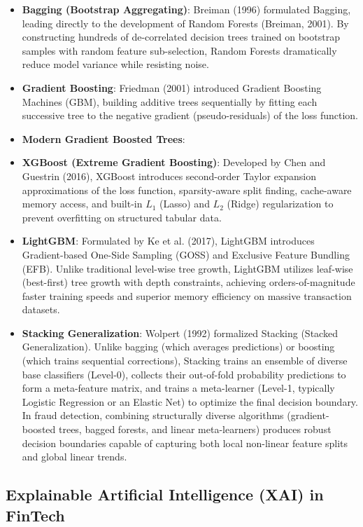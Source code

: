 \documentclass[12pt,a4paper,oneside]{report}
\begin{document}
\begin{itemize}[leftmargin=0.35in]
\item \textbf{Bagging (Bootstrap Aggregating)}: Breiman (1996) formulated Bagging, leading directly to the development of Random Forests (Breiman, 2001). By constructing hundreds of de-correlated decision trees trained on bootstrap samples with random feature sub-selection, Random Forests dramatically reduce model variance while resisting noise.
\item \textbf{Gradient Boosting}: Friedman (2001) introduced Gradient Boosting Machines (GBM), building additive trees sequentially by fitting each successive tree to the negative gradient (pseudo-residuals) of the loss function.
\item \textbf{Modern Gradient Boosted Trees}:
\item \textbf{XGBoost (Extreme Gradient Boosting)}: Developed by Chen and Guestrin (2016), XGBoost introduces second-order Taylor expansion approximations of the loss function, sparsity-aware split finding, cache-aware memory access, and built-in $L_1$ (Lasso) and $L_2$ (Ridge) regularization to prevent overfitting on structured tabular data.
\item \textbf{LightGBM}: Formulated by Ke et al. (2017), LightGBM introduces Gradient-based One-Side Sampling (GOSS) and Exclusive Feature Bundling (EFB). Unlike traditional level-wise tree growth, LightGBM utilizes leaf-wise (best-first) tree growth with depth constraints, achieving orders-of-magnitude faster training speeds and superior memory efficiency on massive transaction datasets.
\item \textbf{Stacking Generalization}: Wolpert (1992) formalized Stacking (Stacked Generalization). Unlike bagging (which averages predictions) or boosting (which trains sequential corrections), Stacking trains an ensemble of diverse base classifiers (Level-0), collects their out-of-fold probability predictions to form a meta-feature matrix, and trains a meta-learner (Level-1, typically Logistic Regression or an Elastic Net) to optimize the final decision boundary. In fraud detection, combining structurally diverse algorithms (gradient-boosted trees, bagged forests, and linear meta-learners) produces robust decision boundaries capable of capturing both local non-linear feature splits and global linear trends.
\end{itemize}

\subsection{Explainable Artificial Intelligence (XAI) in FinTech}
\end{document}
